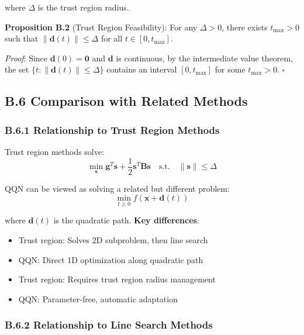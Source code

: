where \(\Delta\) is the trust region radius.

\textbf{Proposition B.2} (Trust Region Feasibility): For any \(\Delta > 0\), there exists \(t_{\max} > 0\) such that \(\|\mathbf{d}(t)\| \leq \Delta\) for all \(t \in [0, t_{\max}]\).

\emph{Proof}: Since \(\mathbf{d}(0) = \mathbf{0}\) and \(\mathbf{d}\) is continuous, by the intermediate value theorem, the set \(\{t : \|\mathbf{d}(t)\| \leq \Delta\}\) contains an interval \([0, t_{\max}]\) for some \(t_{\max} > 0\). \(\square\)

\hypertarget{b.6-comparison-with-related-methods}{%
\subsection{B.6 Comparison with Related Methods}\label{b.6-comparison-with-related-methods}}

\hypertarget{b.6.1-relationship-to-trust-region-methods}{%
\subsubsection{B.6.1 Relationship to Trust Region Methods}\label{b.6.1-relationship-to-trust-region-methods}}

Trust region methods solve:
\[\min_{\mathbf{s}} \mathbf{g}^T\mathbf{s} + \frac{1}{2}\mathbf{s}^T\mathbf{B}\mathbf{s} \quad \text{s.t.} \quad \|\mathbf{s}\| \leq \Delta\]

QQN can be viewed as solving a related but different problem:
\[\min_{t \geq 0} f(\mathbf{x} + \mathbf{d}(t))\]

where \(\mathbf{d}(t)\) is the quadratic path.
\textbf{Key differences}:

\begin{itemize}
\tightlist
\item
  Trust region: Solves 2D subproblem, then line search
\item
  QQN: Direct 1D optimization along quadratic path
\item
  Trust region: Requires trust region radius management
\item
  QQN: Parameter-free, automatic adaptation
\end{itemize}

\hypertarget{b.6.2-relationship-to-line-search-methods}{%
\subsubsection{B.6.2 Relationship to Line Search Methods}\label{b.6.2-relationship-to-line-search-methods}}


